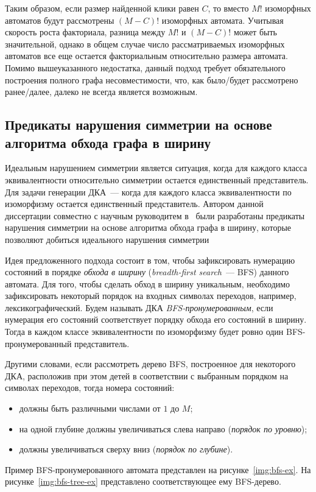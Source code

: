 Таким образом, если размер найденной клики равен $C$, то вместо $M!$ изоморфных автоматов будут рассмотрены $(M - C)!$ изоморфных автомата.
Учитывая скорость роста факториала, разница между $M!$ и $(M - C)!$ может быть значительной, однако в общем случае число рассматриваемых изоморфных автоматов все еще остается факториальным относительно размера автомата.
Помимо вышеуказанного недостатка, данный подход требует обязательного построения полного графа несовместимости, что, как было/будет  рассмотрено ранее/далее, далеко не всегда является возможным.

\subsection{Предикаты нарушения симметрии на основе алгоритма обхода графа в ширину}
\label{sec:review:sym-breaking:bfs-based}

Идеальным нарушением симметрии является ситуация, когда для каждого класса эквивалентности относительно симметрии остается единственный представитель. 
Для задачи генерации ДКА~{---} когда для каждого класса эквивалентности по изоморфизму остается единственный представитель.
Автором данной диссертации совместно с научным руководитем  в~\cite{zakirzyanov2015LATA} были разработаны предикаты нарушения симметрии на основе алгоритма обхода графа в ширину, которые позволяют добиться идеального нарушения симметрии

Идея предложенного подхода состоит в том, чтобы зафиксировать нумерацию состояний в порядке \emph{обхода в ширину} (\emph{breadth-first search}~{---} BFS) данного автомата.
Для того, чтобы сделать обход в ширину уникальным, необходимо зафиксировать некоторый порядок на входных символах переходов, например, лексикографический. 
Будем называть ДКА \emph{BFS-пронумерованным}, если нумерация его состояний соответствует порядку обхода его состояний в ширину.
Тогда в каждом классе эквивалентности по изоморфизму будет ровно один BFS-пронумерованный представитель.

Другими словами, если рассмотреть дерево BFS, построенное для некоторого ДКА, расположив при этом детей в соответствии с выбранным порядком на символах переходов, тогда номера состояний:
\begin{itemize}
  \item должны быть различными числами от $1$ до $M$;
  \item на одной глубине должны увеличиваться слева направо (\emph{порядок по уровню});
  \item должны увеличиваться сверху вниз (\emph{порядок по глубине}).
\end{itemize}
Пример BFS-пронумерованного автомата представлен на рисунке~\ref{img:bfs-ex}.
На рисунке~\ref{img:bfs-tree-ex} представлено соответствующее ему BFS-дерево.

